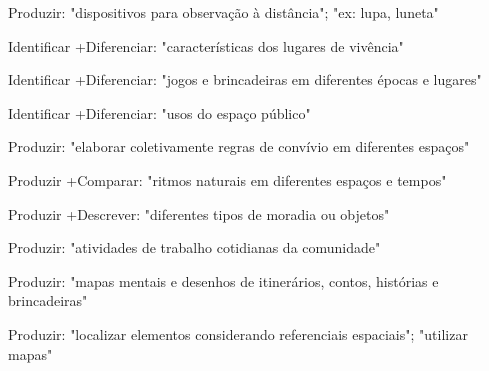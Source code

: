 Produzir: "dispositivos para observação à distância"; "ex: lupa, luneta"

 Identificar +Diferenciar: "características dos lugares de vivência"

 Identificar +Diferenciar: "jogos e brincadeiras em diferentes épocas e lugares"

 Identificar +Diferenciar: "usos do espaço público"

 Produzir: "elaborar coletivamente regras de convívio em diferentes espaços"

 Produzir +Comparar: "ritmos naturais em diferentes espaços e tempos"

 Produzir +Descrever: "diferentes tipos de moradia ou objetos"

 Produzir: "atividades de trabalho cotidianas da comunidade"

 Produzir: "mapas mentais e desenhos de itinerários, contos, histórias e brincadeiras"

 Produzir: "localizar elementos considerando referenciais espaciais"; "utilizar mapas"

